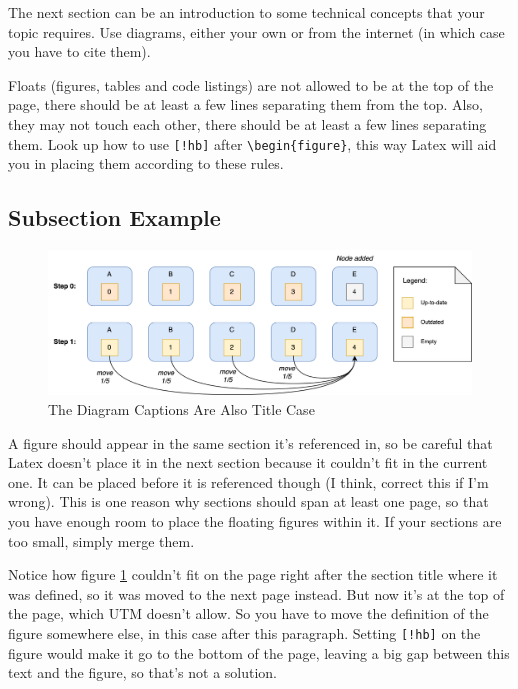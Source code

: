 The next section can be an introduction to some technical concepts that your topic requires.
Use diagrams, either your own or from the internet (in which case you have to cite them).

Floats (figures, tables and code listings) are not allowed to be at the top of the page,
there should be at least a few lines separating them from the top.
Also, they may not touch each other, there should be at least a few lines separating them.
Look up how to use \verb|[!hb]| after \verb|\begin{figure}|, 
this way Latex will aid you in placing them according to these rules.

\subsection{Subsection Example}

\begin{figure}[h]
\centering
\includegraphics[width=0.8\linewidth]{img/diagram.png}
\caption{\label{fig:diagram}The Diagram Captions Are Also Title Case \cite{greenwade93}}
\end{figure}

A figure should appear in the same section it's referenced in, 
so be careful that Latex doesn't place it in the next section because it couldn't fit in the current one.
It can be placed before it is referenced though (I think, correct this if I'm wrong).
This is one reason why sections should span at least one page,
so that you have enough room to place the floating figures within it.
If your sections are too small, simply merge them.

Notice how figure \ref{fig:diagram} couldn't fit on the page right after the section title where it was defined,
so it was moved to the next page instead.
But now it's at the top of the page, which UTM doesn't allow.
So you have to move the definition of the figure somewhere else,
in this case after this paragraph.
Setting \verb|[!hb]| on the figure would make it go to the bottom of the page,
leaving a big gap between this text and the figure,
so that's not a solution.


